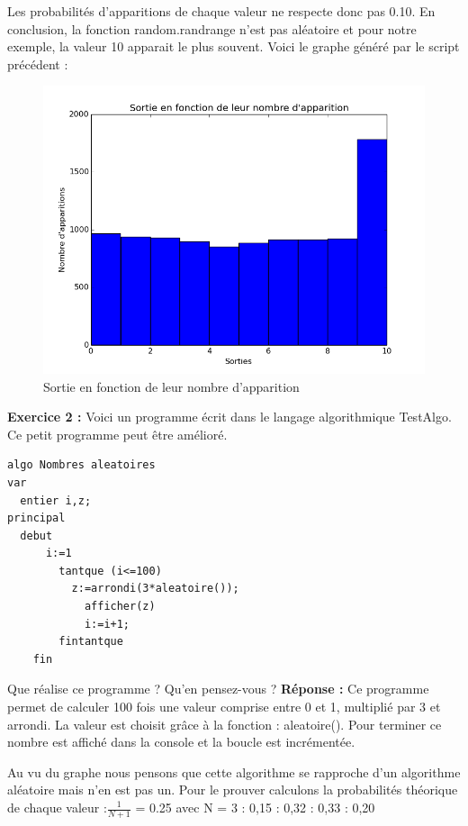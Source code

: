 \documentclass[oneside]{book}
\begin{document}
Les probabilités d'apparitions de chaque valeur ne respecte donc pas 0.10. En conclusion, la fonction random.randrange n'est pas aléatoire et pour notre exemple, la valeur 10 apparait le plus souvent.
\newpage
Voici le graphe généré par le script précédent : 
\begin{figure}[h!]
	\centering
	\includegraphics[width=\textwidth]{Nombre_pseudo-aleatoires_exo1.png}
	\caption{Sortie en fonction de leur nombre d'apparition}
	\label{fig:cc40}
\end{figure}
\newline
\textbf{Exercice 2 :}
Voici un programme écrit dans le langage algorithmique TestAlgo.
Ce petit programme peut être amélioré.
\begin{lstlisting}[frame=single]
algo Nombres aleatoires
var
  entier i,z;
principal
  debut
	  i:=1
		tantque (i<=100)
		  z:=arrondi(3*aleatoire());
			afficher(z)
			i:=i+1;
		fintantque
	fin
\end{lstlisting} 
\newpage Que réalise ce programme ? Qu'en pensez-vous ? \newline 
\textbf{Réponse :} \newline
Ce programme permet de calculer 100 fois une valeur comprise entre 0 et 1, multiplié par 3 et arrondi. La valeur est choisit grâce à la fonction : aleatoire(). Pour terminer ce nombre est affiché dans la console et la boucle est incrémentée.

Au vu du graphe nous pensons que cette algorithme se rapproche d'un algorithme aléatoire mais n'en est pas un. Pour le prouver calculons la probabilités théorique de chaque valeur :\newline \newline $\frac{1}{N+1}$ = 0.25 avec N = 3 \newline {} : 0,15  : 0,32  : 0,33  : 0,20 \newline
\end{document}
